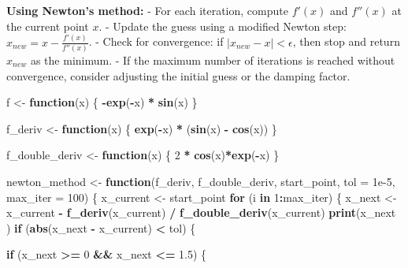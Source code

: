 \documentclass[
]{article}
\newenvironment{Shaded}{\begin{snugshade}}{\end{snugshade}}
\newcommand{\AttributeTok}[1]{\textcolor[rgb]{0.13,0.29,0.53}{#1}}
\newcommand{\ControlFlowTok}[1]{\textcolor[rgb]{0.13,0.29,0.53}{\textbf{#1}}}
\newcommand{\DecValTok}[1]{\textcolor[rgb]{0.00,0.00,0.81}{#1}}
\newcommand{\FloatTok}[1]{\textcolor[rgb]{0.00,0.00,0.81}{#1}}
\newcommand{\FunctionTok}[1]{\textcolor[rgb]{0.13,0.29,0.53}{\textbf{#1}}}
\newcommand{\NormalTok}[1]{#1}
\newcommand{\OtherTok}[1]{\textcolor[rgb]{0.56,0.35,0.01}{#1}}
\newcommand{\SpecialCharTok}[1]{\textcolor[rgb]{0.81,0.36,0.00}{\textbf{#1}}}
\begin{document}
\textbf{Using Newton's method:} - For each iteration, compute \(f'(x)\)
and \(f''(x)\) at the current point \(x\). - Update the guess using a
modified Newton step: \(x_{new} = x -\frac{f'(x)}{f''(x)}\). - Check for
convergence: if \(|x_{new} - x| < \epsilon\), then stop and return
\(x_{new}\) as the minimum. - If the maximum number of iterations is
reached without convergence, consider adjusting the initial guess or the
damping factor.

\begin{Shaded}
\begin{Highlighting}[]
\NormalTok{f }\OtherTok{\textless{}{-}} \ControlFlowTok{function}\NormalTok{(x) \{}
  \SpecialCharTok{{-}}\FunctionTok{exp}\NormalTok{(}\SpecialCharTok{{-}}\NormalTok{x) }\SpecialCharTok{*} \FunctionTok{sin}\NormalTok{(x)}
\NormalTok{\}}

\NormalTok{f\_deriv }\OtherTok{\textless{}{-}} \ControlFlowTok{function}\NormalTok{(x) \{}
  \FunctionTok{exp}\NormalTok{(}\SpecialCharTok{{-}}\NormalTok{x) }\SpecialCharTok{*}\NormalTok{ (}\FunctionTok{sin}\NormalTok{(x) }\SpecialCharTok{{-}} \FunctionTok{cos}\NormalTok{(x))}
\NormalTok{\}}

\NormalTok{f\_double\_deriv }\OtherTok{\textless{}{-}} \ControlFlowTok{function}\NormalTok{(x) \{}
  \DecValTok{2} \SpecialCharTok{*} \FunctionTok{cos}\NormalTok{(x)}\SpecialCharTok{*}\FunctionTok{exp}\NormalTok{(}\SpecialCharTok{{-}}\NormalTok{x) }
\NormalTok{\}}

\NormalTok{newton\_method }\OtherTok{\textless{}{-}} \ControlFlowTok{function}\NormalTok{(f\_deriv, f\_double\_deriv, }
\NormalTok{                          start\_point, }\AttributeTok{tol =} \FloatTok{1e{-}5}\NormalTok{, }\AttributeTok{max\_iter =} \DecValTok{100}\NormalTok{) \{}
\NormalTok{  x\_current }\OtherTok{\textless{}{-}}\NormalTok{ start\_point}
  \ControlFlowTok{for}\NormalTok{ (i }\ControlFlowTok{in} \DecValTok{1}\SpecialCharTok{:}\NormalTok{max\_iter) \{}
\NormalTok{    x\_next }\OtherTok{\textless{}{-}}\NormalTok{ x\_current }\SpecialCharTok{{-}} \FunctionTok{f\_deriv}\NormalTok{(x\_current) }\SpecialCharTok{/} \FunctionTok{f\_double\_deriv}\NormalTok{(x\_current)}
     \FunctionTok{print}\NormalTok{(x\_next )}
    \ControlFlowTok{if}\NormalTok{ (}\FunctionTok{abs}\NormalTok{(x\_next }\SpecialCharTok{{-}}\NormalTok{ x\_current) }\SpecialCharTok{\textless{}}\NormalTok{ tol) \{}
     
      \ControlFlowTok{if}\NormalTok{ (x\_next }\SpecialCharTok{\textgreater{}=} \DecValTok{0} \SpecialCharTok{\&\&}\NormalTok{ x\_next }\SpecialCharTok{\textless{}=} \FloatTok{1.5}\NormalTok{) \{}
        

\end{Highlighting}
\end{Shaded}
\end{document}
